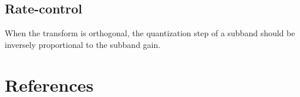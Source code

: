 
\subsection{Rate-control}
When the transform is orthogonal, the quantization step of a subband should be inversely proportional to the subband gain.  

\section{References}
\renewcommand{\addcontentsline}[3]{}%

